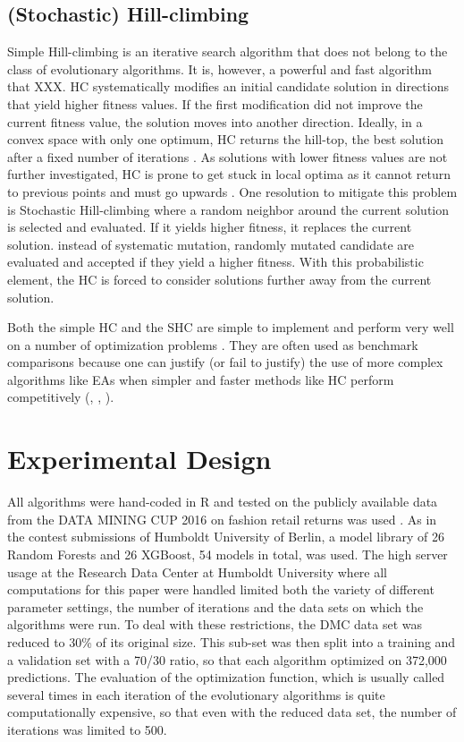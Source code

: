 \subsection{(Stochastic) Hill-climbing}
Simple Hill-climbing is an iterative search algorithm that does not belong to the class of evolutionary algorithms. It is, however, a powerful and fast algorithm that XXX.
HC systematically modifies an initial candidate solution in directions that yield higher fitness values. If the first modification did not improve the current fitness value, the solution moves into another direction. Ideally, in a convex space with only one optimum, HC returns the hill-top, the best solution after a fixed number of iterations \cite[p. 252]{skiena2008algorithm}. As solutions with lower fitness values are not further investigated, HC is prone to get stuck in local optima as it cannot return to previous points and must go upwards \cite[p. 113]{russell1995modern}. 
One resolution to mitigate this problem is Stochastic Hill-climbing where a random neighbor around the current solution is selected and evaluated. If it yields higher fitness, it replaces the current solution. instead of systematic mutation, randomly mutated candidate are evaluated and accepted if they yield a higher fitness. With this probabilistic element, the HC is forced to consider solutions further away from the current solution.

Both the simple HC and the SHC are simple to implement and perform very well on a number of optimization problems \citep{Jacobson2004}. They are often used as benchmark comparisons because one can justify (or fail to justify) the use of more complex algorithms like EAs when simpler and faster methods like HC perform competitively (\cite{mitchell1993will}, \cite{wattenberg1996stochastic}, \cite{PRUGELBENNETT2004135}).





\section{Experimental Design}
\label{design}
All algorithms were hand-coded in R and tested on the publicly available data from the DATA MINING CUP 2016 on fashion retail returns was used \citep{dmcdata}. As in the contest submissions of Humboldt University of Berlin, a model library of 26 Random Forests and 26 XGBoost, 54 models in total, was used. 
The high server usage at the Research Data Center at Humboldt University where all computations for this paper were handled limited both the variety of different parameter settings, the number of iterations and the data sets on which the algorithms were run. 
To deal with these restrictions, the DMC data set was reduced to 30\% of its original size. This sub-set was then split into a training and a validation set with a 70/30 ratio, so that each algorithm optimized on 372,000 predictions. The evaluation of the optimization function, which is usually called several times in each iteration of the evolutionary algorithms is quite computationally expensive, so that even with the reduced data set, the number of iterations was limited to 500.


